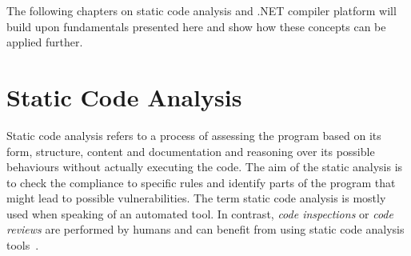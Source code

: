 \documentclass[
  digital, %
  table,   %
  lof,     %
  lot,     %
  oneside,
]{fithesis3}
\begin{document}
\bigskip
The following chapters on static code analysis and .NET compiler platform will build upon fundamentals presented here and show how these concepts can be applied further.

  \newpage
\chapter{Static Code Analysis}
\label{chap:static-code-analysis}
Static code analysis refers to a process of assessing the program based on its form, structure, content and documentation and reasoning over its possible behaviours without actually executing the code. The aim of the static analysis is to check the compliance to specific rules and identify parts of the program that might lead to possible vulnerabilities. The term static code analysis is mostly used when speaking of an automated tool. In contrast, \textit{code inspections} or \textit{code reviews} are performed by humans and can benefit from using static code analysis tools~\cite{oswap-sca, ppt-sca}.
\end{document}

